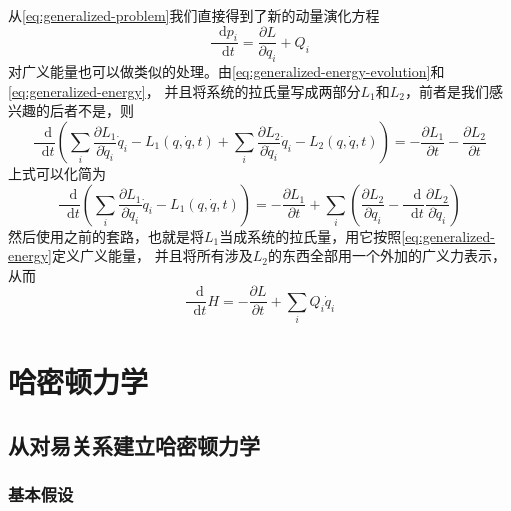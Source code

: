 \documentclass[UTF8, a4paper]{ctexart}
\newcommand*{\diff}{\mathop{}\!\mathrm{d}}
\begin{document}
从\eqref{eq:generalized-problem}我们直接得到了新的动量演化方程
\begin{equation}
    \frac{\diff p_i}{\diff t} = \frac{\partial L}{\partial q_i} + Q_i
\end{equation}
对广义能量也可以做类似的处理。由\eqref{eq:generalized-energy-evolution}和\eqref{eq:generalized-energy}，
并且将系统的拉氏量写成两部分$L_1$和$L_2$，前者是我们感兴趣的后者不是，则
\[
    \frac{\diff}{\diff t} \left(
        \sum_i \frac{\partial L_1}{\partial \dot{q}_i} \dot{q}_i - L_1(q, \dot{q}, t)
        + \sum_i \frac{\partial L_2}{\partial \dot{q}_i} \dot{q}_i - L_2(q, \dot{q}, t)
    \right)
    = - \frac{\partial L_1}{\partial t} - \frac{\partial L_2}{\partial t}
\]
上式可以化简为
\[
    \frac{\diff}{\diff t} \left(
        \sum_i \frac{\partial L_1}{\partial \dot{q}_i} \dot{q}_i - L_1(q, \dot{q}, t)
    \right) = 
    - \frac{\partial L_1}{\partial t} 
    + \sum_i \left( 
        \frac{\partial L_2}{\partial q_i} - \frac{\diff}{\diff t} \frac{\partial L_2}{\partial \dot{q}_i} 
    \right)
\]
然后使用之前的套路，也就是将$L_1$当成系统的拉氏量，用它按照\eqref{eq:generalized-energy}定义广义能量，
并且将所有涉及$L_2$的东西全部用一个外加的广义力表示，从而
\begin{equation}
    \frac{\diff}{\diff t} H = - \frac{\partial L}{\partial t} + \sum_i Q_i \dot{q}_i
    \label{eq:nc-generalized-energy-evolution}
\end{equation}

\section{哈密顿力学}
\label{sec:hamiltonian-formalization}

\subsection{从对易关系建立哈密顿力学}\label{sec:hamilton-from-commutation}

\subsubsection{基本假设}

\end{document}
